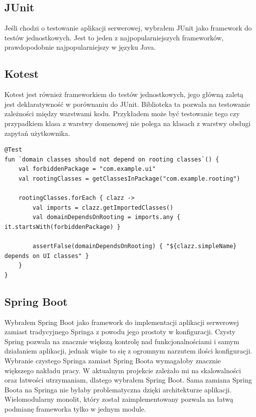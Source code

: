 \subsection{JUnit}\label{subsec:uzyte-technologie-junit}
Jeśli chodzi o testowanie aplikacji serwerowej, wybrałem JUnit jako framework do testów jednostkowych.
Jest to jeden z najpopularniejszych frameworków, prawdopodobnie najpopularniejszy w języku Java.

\subsection{Kotest}\label{subsec:uzyte-technologie-kotest}
Kotest jest również frameworkiem do testów jednostkowych, jego główną zaletą jest deklaratywność w porównaniu do JUnit.
Biblioteka ta pozwala na testowanie zależności między warstwami kodu.
Przykładem może być testowanie tego czy przypadkiem klasa z warstwy domenowej nie polega na klasach z warstwy obsługi zapytań użytkownika.
\begin{lstlisting}[caption=Przykład testu w Kotest]
@Test
fun `domain classes should not depend on rooting classes`() {
    val forbiddenPackage = "com.example.ui"
    val rootingClasses = getClassesInPackage("com.example.rooting")

    rootingClasses.forEach { clazz ->
        val imports = clazz.getImportedClasses()
        val domainDependsOnRooting = imports.any { it.startsWith(forbiddenPackage) }

        assertFalse(domainDependsOnRooting) { "${clazz.simpleName} depends on UI classes" }
    }
}
\end{lstlisting}

\subsection{Spring Boot}\label{subsec:uzyte-technologie-spring-boot}
Wybrałem Spring Boot jako framework do implementacji aplikacji serwerowej zamiast tradycyjnego Springa z powodu jego prostoty w konfiguracji.
Czysty Spring pozwala na znacznie większą kontrolę nad funkcjonalnościami i samym działaniem aplikacji, jednak wiąże to się z ogromnym narzutem ilości konfiguracji.
Wybranie czystego Springa zamiast Spring Boota wymagałoby znacznie większego nakładu pracy.
W aktualnym projekcie zależało mi na skalowalności oraz łatwości utrzymaniam, dlatego wybrałem Spring Boot.
Sama zamiana Spring Boota na Springa nie byłaby problematyczna dzięki architekturze aplikacji.
Wielomodularny monolit, który został zaimplementowany pozwala na łatwą podmianę frameworka tylko w jednym module.

